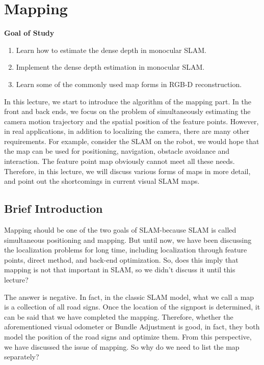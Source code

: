 \chapter{Mapping}
\begin{mdframed}  
	\textbf{Goal of Study}
	\begin{enumerate}[labelindent=0em,leftmargin=1.5em]
		\item Learn how to estimate the dense depth in monocular SLAM. 
		\item Implement the dense depth estimation in monocular SLAM.
		\item Learn some of the commonly used map forms in RGB-D reconstruction. 
	\end{enumerate}
\end{mdframed}

In this lecture, we start to introduce the algorithm of the mapping part. In the front and back ends, we focus on the problem of simultaneously estimating the camera motion trajectory and the spatial position of the feature points. However, in real applications, in addition to localizing the camera, there are many other requirements. For example, consider the SLAM on the robot, we would hope that the map can be used for positioning, navigation, obstacle avoidance and interaction. The feature point map obviously cannot meet all these needs. Therefore, in this lecture, we will discuss various forms of maps in more detail, and point out the shortcomings in current visual SLAM maps.

\newpage
\section{Brief Introduction}
Mapping should be one of the two goals of SLAM-because SLAM is called simultaneous positioning and mapping. But until now, we have been discussing the localization problems for long time, including localization through feature points, direct method, and back-end optimization. So, does this imply that mapping is not that important in SLAM, so we didn't discuss it until this lecture?

The answer is negative. In fact, in the classic SLAM model, what we call a map is a collection of all road signs. Once the location of the signpost is determined, it can be said that we have completed the mapping. Therefore, whether the aforementioned visual odometer or Bundle Adjustment is good, in fact, they both model the position of the road signs and optimize them. From this perspective, we have discussed the issue of mapping. So why do we need to list the map separately?

